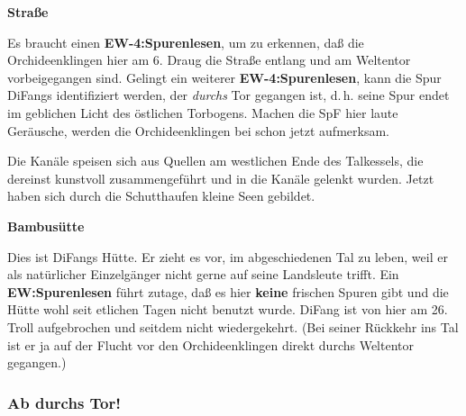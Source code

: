 \documentclass[
a4paper,
twoside,
DIV=calc,
BCOR=4mm,
fontsize=9pt,
twocolumn=on,
titlepage=on,
parskip=half
]{scrartcl}
\begin{document}
\textbf{ Straße}


Es braucht einen \textbf{EW-4:Spurenlesen}, um zu erkennen, daß die
Orchideenklingen hier am 6. Draug die Straße entlang und am Weltentor
vorbeigegangen sind. Gelingt ein weiterer \textbf{EW-4:Spurenlesen},
kann die Spur DiFangs identifiziert werden, der \emph{durchs} Tor
gegangen ist, d.\,h. seine Spur endet im geblichen Licht des östlichen
Torbogens. Machen die SpF hier laute Geräusche, werden die Orchideenklingen
bei  schon jetzt aufmerksam.

Die Kanäle speisen sich aus Quellen am westlichen Ende des Talkessels,
die dereinst kunstvoll zusammengeführt und in die Kanäle gelenkt
wurden. Jetzt haben sich durch die Schutthaufen kleine Seen gebildet.

\textbf{ Bambusütte}


Dies ist DiFangs Hütte. Er zieht es vor, im abgeschiedenen Tal zu
leben, weil er als natürlicher Einzelgänger nicht gerne auf seine
Landsleute trifft. Ein \textbf{EW:Spurenlesen} führt zutage, daß es
hier \textbf{keine} frischen Spuren gibt und die Hütte wohl seit
etlichen Tagen nicht benutzt wurde. DiFang ist von hier am 26. Troll
aufgebrochen und seitdem nicht wiedergekehrt. (Bei seiner Rückkehr ins
Tal ist er ja auf der Flucht vor den Orchideenklingen direkt durchs
Weltentor gegangen.)

\subsubsection{Ab durchs Tor!}
\end{document}
